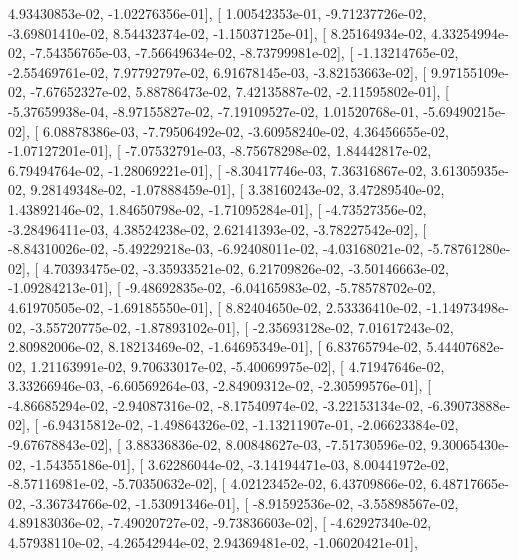 \documentclass{article}
\begin{document}
          4.93430853e-02,  -1.02276356e-01],
       [  1.00542353e-01,  -9.71237726e-02,  -3.69801410e-02,
          8.54432374e-02,  -1.15037125e-01],
       [  8.25164934e-02,   4.33254994e-02,  -7.54356765e-03,
         -7.56649634e-02,  -8.73799981e-02],
       [ -1.13214765e-02,  -2.55469761e-02,   7.97792797e-02,
          6.91678145e-03,  -3.82153663e-02],
       [  9.97155109e-02,  -7.67652327e-02,   5.88786473e-02,
          7.42135887e-02,  -2.11595802e-01],
       [ -5.37659938e-04,  -8.97155827e-02,  -7.19109527e-02,
          1.01520768e-01,  -5.69490215e-02],
       [  6.08878386e-03,  -7.79506492e-02,  -3.60958240e-02,
          4.36456655e-02,  -1.07127201e-01],
       [ -7.07532791e-03,  -8.75678298e-02,   1.84442817e-02,
          6.79494764e-02,  -1.28069221e-01],
       [ -8.30417746e-03,   7.36316867e-02,   3.61305935e-02,
          9.28149348e-02,  -1.07888459e-01],
       [  3.38160243e-02,   3.47289540e-02,   1.43892146e-02,
          1.84650798e-02,  -1.71095284e-01],
       [ -4.73527356e-02,  -3.28496411e-03,   4.38524238e-02,
          2.62141393e-02,  -3.78227542e-02],
       [ -8.84310026e-02,  -5.49229218e-03,  -6.92408011e-02,
         -4.03168021e-02,  -5.78761280e-02],
       [  4.70393475e-02,  -3.35933521e-02,   6.21709826e-02,
         -3.50146663e-02,  -1.09284213e-01],
       [ -9.48692835e-02,  -6.04165983e-02,  -5.78578702e-02,
          4.61970505e-02,  -1.69185550e-01],
       [  8.82404650e-02,   2.53336410e-02,  -1.14973498e-02,
         -3.55720775e-02,  -1.87893102e-01],
       [ -2.35693128e-02,   7.01617243e-02,   2.80982006e-02,
          8.18213469e-02,  -1.64695349e-01],
       [  6.83765794e-02,   5.44407682e-02,   1.21163991e-02,
          9.70633017e-02,  -5.40069975e-02],
       [  4.71947646e-02,   3.33266946e-03,  -6.60569264e-03,
         -2.84909312e-02,  -2.30599576e-01],
       [ -4.86685294e-02,  -2.94087316e-02,  -8.17540974e-02,
         -3.22153134e-02,  -6.39073888e-02],
       [ -6.94315812e-02,  -1.49864326e-02,  -1.13211907e-01,
         -2.06623384e-02,  -9.67678843e-02],
       [  3.88336836e-02,   8.00848627e-03,  -7.51730596e-02,
          9.30065430e-02,  -1.54355186e-01],
       [  3.62286044e-02,  -3.14194471e-03,   8.00441972e-02,
         -8.57116981e-02,  -5.70350632e-02],
       [  4.02123452e-02,   6.43709866e-02,   6.48717665e-02,
         -3.36734766e-02,  -1.53091346e-01],
       [ -8.91592536e-02,  -3.55898567e-02,   4.89183036e-02,
         -7.49020727e-02,  -9.73836603e-02],
       [ -4.62927340e-02,   4.57938110e-02,  -4.26542944e-02,
          2.94369481e-02,  -1.06020421e-01],
\end{document}
